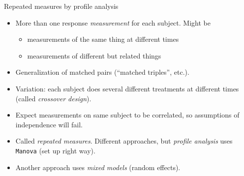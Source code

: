 \documentclass[unknownkeysallowed]{beamer}\usepackage[]{graphicx}\usepackage[]{color}
\begin{document}
\begin{frame}[fragile]{Repeated measures by profile analysis}

  \begin{itemize}
  \item More than one response {\em measurement} for each subject. Might be
    \begin{itemize}
    \item measurements of the same thing at different times
    \item measurements of different but related things
    \end{itemize}
  \item Generalization of matched pairs (``matched triples'', etc.).
  \item Variation: each subject does several different treatments at different times (called {\em crossover design}).
  \item Expect measurements on same subject to be correlated, so
    assumptions of independence will fail.
  \item Called {\em repeated measures}. Different approaches, but {\em
      profile analysis} uses \texttt{Manova} (set up right way).
  \item Another approach uses \emph{mixed models} (random effects).
  \end{itemize}
\end{frame}
\end{document}
